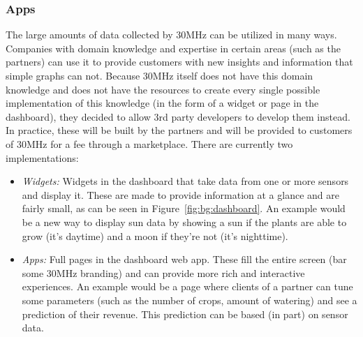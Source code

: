 \subsubsection{Apps}\label{sec:bg:apps}
The large amounts of data collected by 30MHz can be utilized in many ways. Companies with domain knowledge and expertise in certain areas (such as the partners) can use it to provide customers with new insights and information that simple graphs can not. Because 30MHz itself does not have this domain knowledge and does not have the resources to create every single possible implementation of this knowledge (in the form of a widget or page in the dashboard), they decided to allow 3rd party developers to develop them instead. In practice, these will be built by the partners and will be provided to customers of 30MHz for a fee through a marketplace. There are currently two implementations:

\begin{itemize}
	\item \emph{Widgets:} Widgets in the dashboard that take data from one or more sensors and display it. These are made to provide information at a glance and are fairly small, as can be seen in Figure~\ref{fig:bg:dashboard}. An example would be a new way to display sun data by showing a sun if the plants are able to grow (it's daytime) and a moon if they're not (it's nighttime).
	\item \emph{Apps:} Full pages in the dashboard web app. These fill the entire screen (bar some 30MHz branding) and can provide more rich and interactive experiences. An example would be a page where clients of a partner can tune some parameters (such as the number of crops, amount of watering) and see a prediction of their revenue. This prediction can be based (in part) on sensor data.
\end{itemize}

